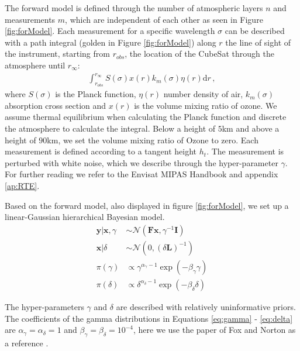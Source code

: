 The forward model is defined through the number of atmospheric layers $n$ and measurements $m$, which are independent of each other as seen in Figure \ref{fig:forModel}.
Each measurement for a specific wavelength $\sigma$ can be described with a path integral (golden in Figure \ref{fig:forModel}) along $r$ the line of sight of the instrument, starting from $r_{obs}$, the location of the CubeSat through the atmosphere until $r_{\infty}$:
\begin{align}
\label{eq:pathInt}
     \int^{r_{\infty}}_{r_{obs}} S(\sigma) x(r) k_m(\sigma) \eta(r) \text{d}r \, ,
\end{align}
where $S(\sigma)$ is the Planck function, $\eta(r)$ number density of air, $k_m(\sigma) $ absorption cross section and $x(r)$ is the volume mixing ratio of ozone.
We assume thermal equilibrium when calculating the Planck function and discrete the atmosphere to calculate the integral.
Below a height of $5$km and above a height of $90$km, we set the volume mixing ratio of Ozone to zero.
Each measurement is defined according to a tangent height $h_t$.
The measurement is perturbed with white noise, which we describe through the hyper-parameter $\gamma$.
For further reading we refer to the Envisat MIPAS Handbook \cite{fischer2000envisat} and appendix \ref{ap:RTE}.

Based on the forward model, also displayed in figure \ref{fig:forModel}, we set up a linear-Gaussian hierarchical Bayesian model.
\begin{subequations}
    \begin{align}
        \bm{y}|\bm{x}, \gamma &\sim \mathcal{N}(\bm{F}\bm{x}, \gamma^{-1}\bm{I}) \\
        \bm{x}| \delta &\sim  \mathcal{N}( 0, (\delta \bm{L})^{-1}  ) \\
        \pi(\gamma) &\propto \gamma^{\alpha_\gamma -1} \exp{(- \beta_\gamma \gamma)} \label{eq:gamma} \\
        \pi(\delta) &\propto \delta^{\alpha_\delta -1} \exp{(- \beta_\delta \delta)} \label{eq:delta}
    \end{align}
\end{subequations}


The hyper-parameters $\gamma$ and $\delta$ are described with relatively uninformative priors.
The coefficients of the gamma distributions in Equations \ref{eq:gamma} - \ref{eq:delta} are $\alpha_\gamma = \alpha_\delta = 1 $ and $\beta_\gamma = \beta_\delta = 10^{-4}$, here we use the paper of Fox and Norton as a reference \cite{fox2016fast}.

